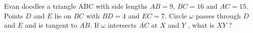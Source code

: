 Evan doodles a triangle ABC with side lengths $AB = 9$, $BC = 16$ and $AC = 15$. Points $D$ and $E$ lie on $\overline{BC}$ with $BD = 4$ and $EC = 7$. Circle $\omega$ passes through $D$ and $E$ and is tangent to $\overline{AB}$. If $\omega$ intersects $\overline{AC}$ at $X$ and $Y$ , what is $XY$ ?
